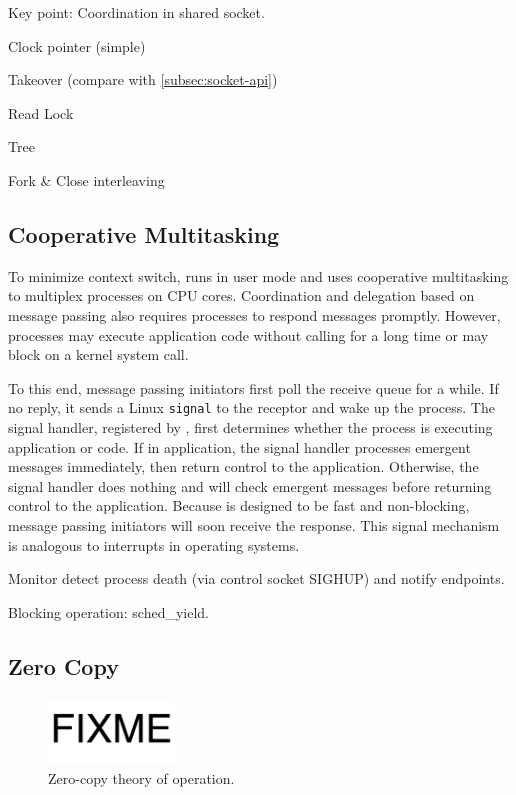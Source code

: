 Key point: Coordination in shared socket.

Clock pointer (simple)

Takeover (compare with \ref{subsec:socket-api})

Read Lock

Tree

Fork \& Close interleaving

\subsection{Cooperative Multitasking}
\label{subsec:process-mux}

To minimize context switch, \sys{} runs in user mode and uses cooperative multitasking to multiplex processes on CPU cores. Coordination and delegation based on message passing also requires processes to respond messages promptly. However, processes may execute application code without calling \libipc for a long time or may block on a kernel system call.

To this end, message passing initiators first poll the receive queue for a while. If no reply, it sends a Linux \texttt{signal} to the receptor and wake up the process. The signal handler, registered by \libipc, first determines whether the process is executing application or \libipc code. If in application, the signal handler processes emergent messages immediately, then return control to the application. Otherwise, the signal handler does nothing and \libipc will check emergent messages before returning control to the application. Because \libipc is designed to be fast and non-blocking, message passing initiators will soon receive the response. This signal mechanism is analogous to interrupts in operating systems.


Monitor detect process death (via control socket SIGHUP) and notify endpoints.

Blocking operation: sched\_yield.


\subsection{Zero Copy}
\label{subsec:zerocopy}

\begin{figure}[t]
	\centering
	\includegraphics[width=0.3\textwidth]{images/fixme}
	\caption{Zero-copy theory of operation.}
	\label{fig:zerocopy}
\end{figure}

